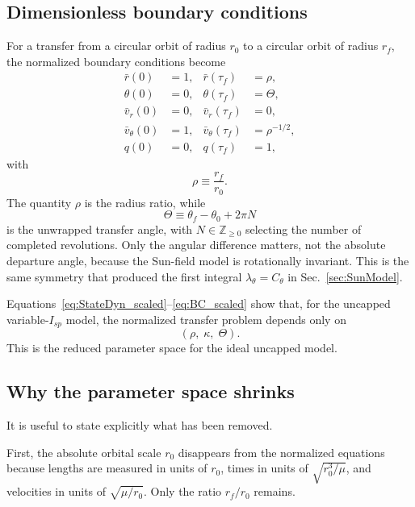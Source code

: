 \documentclass[journal,a4paper]{IEEEtran}
\begin{document}
\subsection{Dimensionless boundary conditions}
For a transfer from a circular orbit of radius \(r_0\) to a circular orbit of radius \(r_f\), the normalized boundary conditions become
\begin{subequations}\label{eq:BC_scaled}
\begin{align}
  \bar r(0) &= 1, &
  \bar r(\tau_f) &= \rho, \\
  \theta(0) &= 0, &
  \theta(\tau_f) &= \Theta,\\
  \bar v_r(0) &= 0, &  \bar v_r(\tau_f) &= 0, \\
  \bar v_\theta(0) &= 1, &\bar v_\theta(\tau_f) &= \rho^{-1/2}, \\
  q(0) &= 0, &q(\tau_f) &= 1,
\end{align}
\end{subequations}
with
\begin{equation}
  \rho \equiv \frac{r_f}{r_0}.
  \label{eq:rho_def_similarity}
\end{equation}
The quantity \(\rho\) is the radius ratio, while
\begin{equation}
  \Theta \equiv \theta_f-\theta_0+2\pi N
  \label{eq:Theta_def_similarity}
\end{equation}
is the unwrapped transfer angle, with \(N\in\mathbb Z_{\ge 0}\) selecting the number of completed revolutions.
Only the angular difference matters, not the absolute departure angle, because the Sun-field model is rotationally invariant.
This is the same symmetry that produced the first integral \(\lambda_\theta=C_\theta\) in Sec.~\ref{sec:SunModel}.

Equations~\eqref{eq:StateDyn_scaled}--\eqref{eq:BC_scaled} show that, for the uncapped variable-\(I_{\!sp}\) model, the normalized transfer problem depends only on
\[
(\rho,\;\kappa,\;\Theta).
\]
This is the reduced parameter space for the ideal uncapped model.

\subsection{Why the parameter space shrinks}
It is useful to state explicitly what has been removed.

First, the absolute orbital scale \(r_0\) disappears from the normalized equations because lengths are measured in units of \(r_0\), times in units of \(\sqrt{r_0^3/\mu}\), and velocities in units of \(\sqrt{\mu/r_0}\).
Only the ratio \(r_f/r_0\) remains.
\end{document}
